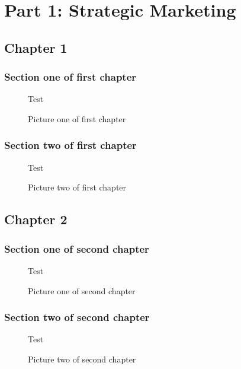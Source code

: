 \documentclass[oneside,12pt]{scrbook}
\begin{document}
\dominitoc \tableofcontents
\dominilof \fakelistoffigures
\part*{Part 1: Strategic Marketing}
\chapter{Chapter 1}
\minitoc \minilof
\section{Section one of first chapter} \lipsum[1]
\begin{figure}
    \centering Test
    \caption{Picture one of first chapter}
\end{figure}

\section{Section two of first chapter} \lipsum[2]
\begin{figure}
    \centering Test
    \caption{Picture two of first chapter}
\end{figure}

\chapter{Chapter 2}
\minitoc \minilof

\section{Section one of second chapter} \lipsum[3]
\begin{figure}
    \centering Test
    \caption{Picture one of second chapter}
\end{figure}
\cleardoublepage
\section{Section two of second chapter} \lipsum[4]
\begin{figure}
    \centering Test
    \caption{Picture two of second chapter}
\end{figure}
\end{document}
